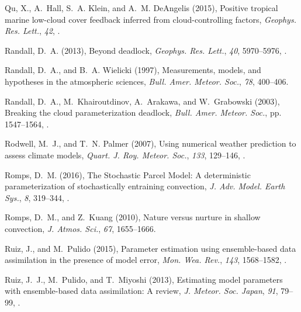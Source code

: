 \documentclass[draft]{agujournal}
\begin{document}
\begin{thebibliography}{196}
Qu, X., A.~Hall, S.~A. Klein, and A.~M. DeAngelis (2015), Positive tropical
  marine low-cloud cover feedback inferred from cloud-controlling factors,
  \textit{Geophys. Res. Lett.}, \textit{42}, .

Randall, D.~A. (2013), Beyond deadlock, \textit{Geophys. Res. Lett.},
  \textit{40}, 5970--5976, .

Randall, D.~A., and B.~A. Wielicki (1997), Measurements, models, and hypotheses
  in the atmospheric sciences, \textit{Bull. Amer. Meteor. Soc.}, \textit{78},
  400--406.

Randall, D.~A., M.~Khairoutdinov, A.~Arakawa, and W.~Grabowski (2003), Breaking
  the cloud parameterization deadlock, \textit{Bull. Amer. Meteor. Soc.}, pp.
  1547--1564, .

Rodwell, M.~J., and T.~N. Palmer (2007), Using numerical weather prediction to
  assess climate models, \textit{Quart. J. Roy. Meteor. Soc.}, \textit{133},
  129--146, .

Romps, D.~M. (2016), The {S}tochastic {P}arcel {M}odel: A deterministic
  parameterization of stochastically entraining convection, \textit{J. Adv.
  Model. Earth Sys.}, \textit{8}, 319--344, .

Romps, D.~M., and Z.~Kuang (2010), Nature versus nurture in shallow convection,
  \textit{J. Atmos. Sci.}, \textit{67}, 1655--1666.

Ruiz, J., and M.~Pulido (2015), Parameter estimation using ensemble-based data
  assimilation in the presence of model error, \textit{Mon. Wea. Rev.},
  \textit{143}, 1568--1582, .

Ruiz, J.~J., M.~Pulido, and T.~Miyoshi (2013), Estimating model parameters with
  ensemble-based data assimilation: A review, \textit{J. Meteor. Soc. Japan},
  \textit{91}, 79--99, .


\end{thebibliography}
\end{document}
